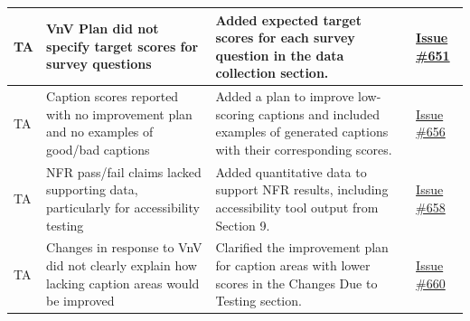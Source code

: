 \documentclass{article}
\begin{document}
\begin{longtable}{|p{2cm}|p{3.5cm}|p{4.5cm}|p{3cm}|}
TA & VnV Plan did not specify target scores for survey questions & Added expected target scores for each survey question in the data collection section. & \href{https://github.com/4G06-CAPSTONE-2025/Reading4All/issues/651}{Issue \#651} \\ \hline

TA & Caption scores reported with no improvement plan and no examples of good/bad captions & Added a plan to improve low-scoring captions and included examples of generated captions with their corresponding scores. & \href{https://github.com/4G06-CAPSTONE-2025/Reading4All/issues/656}{Issue \#656} \\ \hline

TA & NFR pass/fail claims lacked supporting data, particularly for accessibility testing & Added quantitative data to support NFR results, including accessibility tool output from Section 9. & \href{https://github.com/4G06-CAPSTONE-2025/Reading4All/issues/658}{Issue \#658} \\ \hline

TA & Changes in response to VnV did not clearly explain how lacking caption areas would be improved & Clarified the improvement plan for caption areas with lower scores in the Changes Due to Testing section. & \href{https://github.com/4G06-CAPSTONE-2025/Reading4All/issues/660}{Issue \#660}
\end{longtable}
\end{document}
